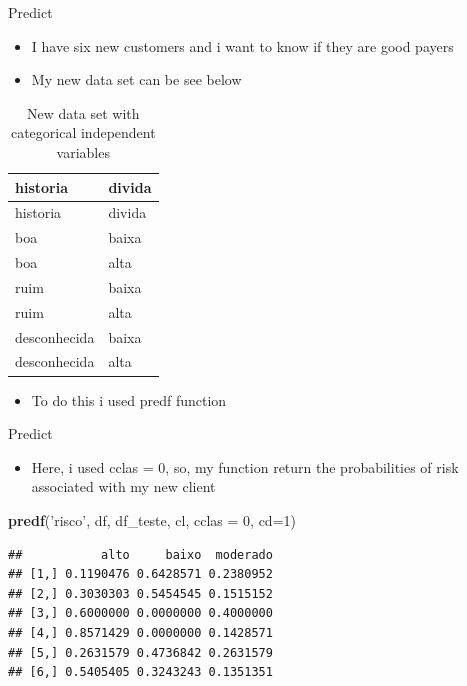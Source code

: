 \documentclass[
  10pt,
  ignorenonframetext,
]{beamer}
\newenvironment{Shaded}{\begin{snugshade}}{\end{snugshade}}
\newcommand{\DataTypeTok}[1]{\textcolor[rgb]{0.13,0.29,0.53}{#1}}
\newcommand{\DecValTok}[1]{\textcolor[rgb]{0.00,0.00,0.81}{#1}}
\newcommand{\KeywordTok}[1]{\textcolor[rgb]{0.13,0.29,0.53}{\textbf{#1}}}
\newcommand{\NormalTok}[1]{#1}
\newcommand{\StringTok}[1]{\textcolor[rgb]{0.31,0.60,0.02}{#1}}
\providecommand{\tightlist}{%
  \setlength{\itemsep}{0pt}\setlength{\parskip}{0pt}}
\begin{document}
\begin{frame}{Predict}
\protect\hypertarget{predict}{}

\begin{itemize}
\tightlist
\item
  I have six new customers and i want to know if they are good payers
\item
  My new data set can be see below
\end{itemize}

\begin{longtable}[]{@{}ll@{}}
\caption{New data set with categorical independent
variables}\tabularnewline
\toprule
historia & divida\tabularnewline
\midrule
\endfirsthead
\toprule
historia & divida\tabularnewline
\midrule
\endhead
boa & baixa\tabularnewline
boa & alta\tabularnewline
ruim & baixa\tabularnewline
ruim & alta\tabularnewline
desconhecida & baixa\tabularnewline
desconhecida & alta\tabularnewline
\bottomrule
\end{longtable}

\begin{itemize}
\tightlist
\item
  To do this i used predf function
\end{itemize}

\end{frame}

\begin{frame}[fragile]{Predict}
\protect\hypertarget{predict-1}{}

\begin{itemize}
\tightlist
\item
  Here, i used cclas = 0, so, my function return the probabilities of
  risk associated with my new client
\end{itemize}

\begin{Shaded}
\begin{Highlighting}[]
\KeywordTok{predf}\NormalTok{(}\StringTok{'risco'}\NormalTok{, df, df_teste, cl, }\DataTypeTok{cclas =} \DecValTok{0}\NormalTok{, }\DataTypeTok{cd=}\DecValTok{1}\NormalTok{)}
\end{Highlighting}
\end{Shaded}

\begin{verbatim}
##           alto     baixo  moderado
## [1,] 0.1190476 0.6428571 0.2380952
## [2,] 0.3030303 0.5454545 0.1515152
## [3,] 0.6000000 0.0000000 0.4000000
## [4,] 0.8571429 0.0000000 0.1428571
## [5,] 0.2631579 0.4736842 0.2631579
## [6,] 0.5405405 0.3243243 0.1351351
\end{verbatim}

\end{frame}
\end{document}
